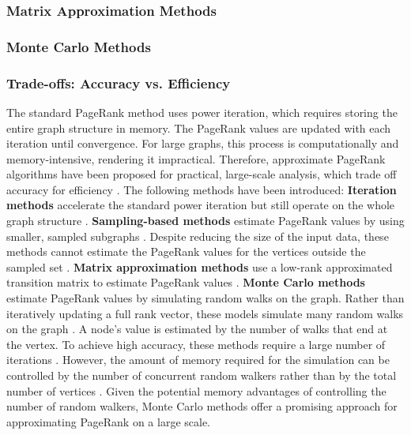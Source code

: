 \subsubsection{Matrix Approximation Methods}
\subsubsection{Monte Carlo Methods}
\subsubsection{Trade-offs: Accuracy vs. Efficiency}

The standard PageRank method uses power iteration, which requires storing the entire graph structure in memory. The PageRank values are updated with each iteration until convergence. For large graphs, this process is computationally and memory-intensive, rendering it impractical. Therefore, approximate PageRank algorithms have been proposed for practical, large-scale analysis, which trade off accuracy for efficiency \cite{wu_efficient_2024}. The following methods have been introduced:
\textbf{Iteration methods} \cite{xie_parameterized_2023-1}\cite{anikin_efficient_2022} accelerate the standard power iteration but still operate on the whole graph structure \cite{wu_efficient_2024}. 
\textbf{Sampling-based methods} estimate PageRank values by using smaller, sampled subgraphs \cite{bar-yossef_local_2008}\cite{chen_local_2004}. Despite reducing the size of the input data, these methods cannot estimate the PageRank values for the vertices outside the sampled set \cite{wu_efficient_2024}.
\textbf{Matrix approximation methods} use a low-rank approximated transition matrix to estimate PageRank values \cite{liu_fast_2015}\cite{benczur_feasibility_2005}. 
\textbf{Monte Carlo methods} estimate PageRank values by simulating random walks on the graph. Rather than iteratively updating a full rank vector, these models simulate many random walks on the graph \cite{avrachenkov_monte_2007}. A node's value is estimated by the number of walks that end at the vertex. To achieve high accuracy, these methods require a large number of iterations \cite{wu_efficient_2024}. However, the amount of memory required for the simulation can be controlled by the number of concurrent random walkers rather than by the total number of vertices \cite{avrachenkov_monte_2007}. Given the potential memory advantages of controlling the number of random walkers, Monte Carlo methods offer a promising approach for approximating PageRank on a large scale.